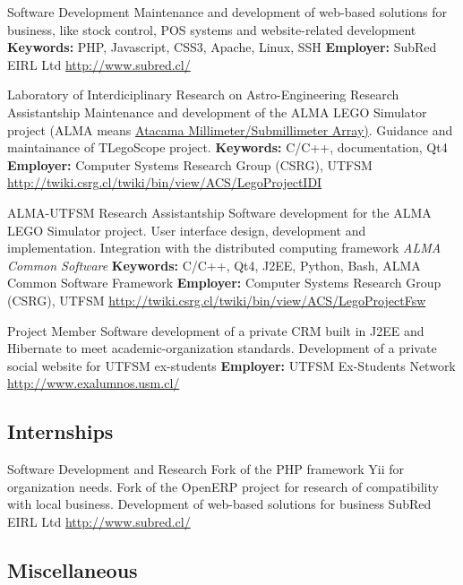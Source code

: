 \documentclass[11pt,a4paper,sans]{moderncv}
\begin{document}
        {Software Development}
        {Maintenance and development of web-based solutions for business, like stock control, POS systems and website-related development}
        {\textbf{Keywords:} PHP, Javascript, CSS3, Apache, Linux, SSH}
        {\textbf{Employer:} SubRed EIRL Ltd}
        {\url{http://www.subred.cl/}}

        {Laboratory of Interdiciplinary Research on Astro-Engineering Research Assistantship}
        {Maintenance and development of the ALMA LEGO Simulator project (ALMA means \href{http://www.alma.cl/}{Atacama Millimeter/Submillimeter Array)}. Guidance and maintainance of TLegoScope project.}
        {\textbf{Keywords:} C/C++, documentation, Qt4}
        {\textbf{Employer:} Computer Systems Research Group (CSRG), UTFSM}
        {\url{http://twiki.csrg.cl/twiki/bin/view/ACS/LegoProjectIDI}}

        {ALMA-UTFSM Research Assistantship}
        {Software development for the ALMA LEGO Simulator project. User interface design, development and implementation. Integration with the distributed computing framework \emph{ALMA Common Software}}
        {\textbf{Keywords:} C/C++, Qt4, J2EE, Python, Bash, ALMA Common Software Framework}
        {\textbf{Employer:} Computer Systems Research Group (CSRG), UTFSM}
        {\url{http://twiki.csrg.cl/twiki/bin/view/ACS/LegoProjectFsw}}

        {Project Member}
        {Software development of a private CRM built in J2EE and Hibernate to meet academic-organization standards. Development of a private social website for UTFSM ex-students}
        {\textbf{Employer:} UTFSM Ex-Students Network}
        {}
        {\url{http://www.exalumnos.usm.cl/}}


\subsection{Internships}


        {Software Development and Research}
        {Fork of the PHP framework Yii for organization needs. Fork of the OpenERP project for research of compatibility with local business. Development of web-based solutions for business}
        {SubRed EIRL Ltd}
        {}
        {\url{http://www.subred.cl/}}


\subsection{Miscellaneous}
\end{document}
